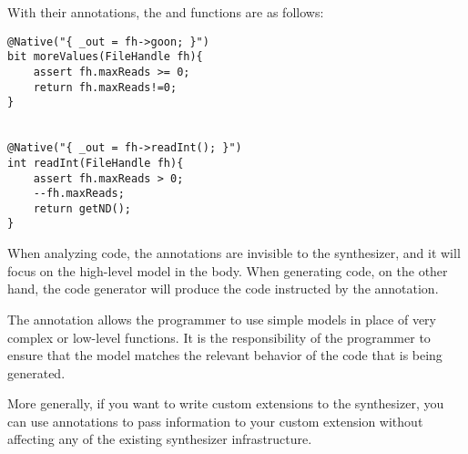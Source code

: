 \begin{Example}
With their annotations, the  and  functions are as follows:
\begin{lstlisting}
@Native("{ _out = fh->goon; }")
bit moreValues(FileHandle fh){
    assert fh.maxReads >= 0; 
    return fh.maxReads!=0;
}


@Native("{ _out = fh->readInt(); }")
int readInt(FileHandle fh){
    assert fh.maxReads > 0;
    --fh.maxReads; 
    return getND();
}
\end{lstlisting}

When analyzing code, the annotations are invisible to the synthesizer, and it will focus on the high-level model in the body. When generating code, on the other hand, the code generator will produce the code instructed by the  annotation.

\end{Example}

The  annotation allows the programmer to use simple models in place of very complex or low-level functions. It is the responsibility of the programmer to ensure that the model matches the relevant behavior of the code that is being generated. 

More generally, if you want to write custom extensions to the \Sk{} synthesizer, you can use annotations to pass information to your custom extension without affecting any of the existing synthesizer infrastructure. 
